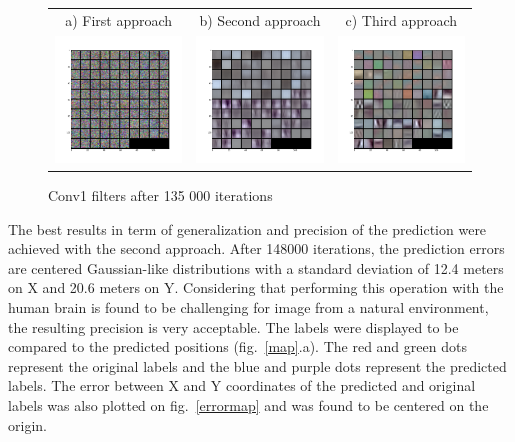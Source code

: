 \begin{figure}[htb]
\centering
\begin{tabular}{ccc}
    a) First approach & b) Second approach & c) Third approach \\
    \includegraphics[width=0.3\linewidth]{images/regression/conv1_26_135000}&
    \includegraphics[width=0.3\linewidth]{images/regression/conv1_37_135000}&
    \includegraphics[width=0.3\linewidth]{images/regression/conv1_30_135000}\\
\end{tabular}
\caption{Conv1 filters after 135 000 iterations}
\label{1appfilter}
\label{2appfilter}
\label{3appfilter}
\end{figure}

The best results in term of generalization and precision of the prediction were achieved with the second approach. After 148000 iterations, the prediction errors are centered Gaussian-like distributions with a standard deviation of 12.4 meters on X and 20.6 meters on Y. Considering that performing this operation with the human brain is found to be challenging for image from a natural environment, the resulting precision is very acceptable. The labels were displayed to be compared to the predicted positions (fig.~\ref{map}.a). The red and green dots represent the original labels and the blue and purple dots represent the predicted labels. The error between X and Y coordinates of the predicted and original labels was also plotted on fig.~\ref{errormap} and was found to be centered on the origin.

